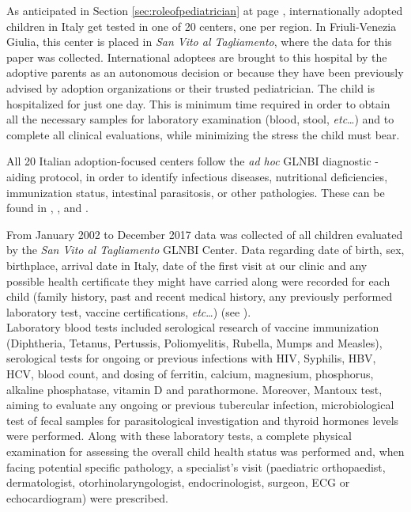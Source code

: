 

\label{chap:materialsandmethods}
As anticipated in Section \ref{sec:roleofpediatrician} at page \pageref{sec:roleofpediatrician},  internationally adopted children in Italy get tested in one of 20 centers, one per region. In Friuli-Venezia Giulia, this center is placed in \textit{San Vito al Tagliamento}, where the data for this paper was collected. International adoptees are brought to this hospital by the adoptive parents as an autonomous decision or because they have been previously advised by adoption organizations or their trusted pediatrician. The child is hospitalized for just one day. This is minimum time required in order to obtain all the necessary samples for laboratory examination (blood, stool, \textit{etc}\dots) and to complete all clinical evaluations, while minimizing the stress the child must bear.

All 20 Italian adoption-focused centers follow the \textit{ad hoc} GLNBI diagnostic - aiding protocol,  in order to identify infectious diseases, nutritional deficiencies, immunization status, intestinal parasitosis, or other pathologies. These can be found in \cite{GNLBI1}, \cite{GNLBI2}, and \cite{GNLBI3}.

From  January 2002 to  December 2017 data was collected of all children evaluated by the \textit{San Vito al Tagliamento} GLNBI Center. Data regarding date of birth, sex, birthplace, arrival date in Italy, date of the first visit at our clinic and any possible health certificate they might have carried along were recorded for each child (family history, past and recent medical history, any previously performed laboratory test, vaccine certifications, \textit{etc}\dots) (see \cite{redbook}).\\
Laboratory blood tests included serological research of vaccine immunization (Diphtheria, Tetanus, Pertussis, Poliomyelitis, Rubella, Mumps and Measles), serological tests for ongoing or previous infections with HIV, Syphilis, HBV, HCV, blood count, and dosing of ferritin, calcium, magnesium, phosphorus, alkaline phosphatase, vitamin D and parathormone. Moreover, Mantoux test, aiming to evaluate any ongoing or previous tubercular infection, microbiological test of fecal samples for parasitological investigation and thyroid hormones levels were performed.
Along with these laboratory tests, a complete physical examination for assessing the overall child health status was performed and, when facing potential specific pathology, a specialist’s visit (paediatric orthopaedist, dermatologist, otorhinolaryngologist, endocrinologist, surgeon, ECG or echocardiogram) were prescribed.


